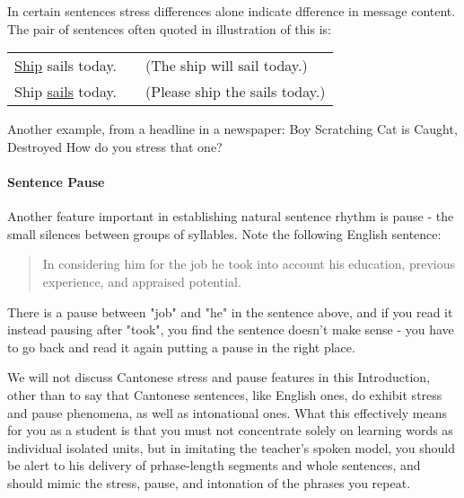 In certain sentences stress differences alone indicate dfference in message content. The pair of sentences often quoted in illustration of this is:

\begin{tabularx}{\linewidth}{X X X}
\underline{Ship} sails today. && (The ship will sail today.) \\
Ship \underline{sails} today. && (Please ship the sails today.) \\
\end{tabularx}

Another example, from a headline in a newspaper:
\indent Boy Scratching Cat is Caught, Destroyed
How do you stress that one?

\paragraph{Sentence Pause}

Another feature important in establishing natural sentence rhythm is pause - the small silences between groups of syllables. Note the following English sentence:

\begin{quote}
	In considering him for the job he took into account his education, previous experience, and appraised potential.
\end{quote}

There is a pause between "job" and "he" in the sentence above, and if you read it instead pausing after "took", you find the sentence doesn't make sense - you have to go back and read it again putting a pause in the right place.

We will not discuss Cantonese stress and pause features in this Introduction, other than to say that Cantonese sentences, like English ones, do exhibit stress and pause phenomena, as well as intonational ones. What this effectively means for you as a student is that you must not concentrate solely on learning words as individual isolated units, but in imitating the teacher's spoken model, you should be alert to his delivery of prhase-length segments and whole sentences, and should mimic the stress, pause, and intonation of the phrases you repeat.
